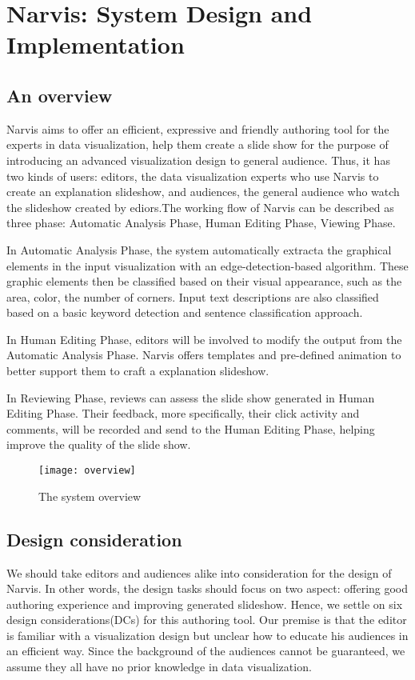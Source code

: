 
\section{Narvis: System Design and Implementation}
\subsection{An overview}

Narvis aims to offer an efficient, expressive and friendly authoring tool for the experts in data visualization, help them create a slide show for the purpose of introducing an advanced visualization design to general audience.  Thus, it has two kinds of users: editors, the data visualization experts who use Narvis to create an explanation slideshow, and audiences, the general audience who watch the slideshow created by ediors.The working flow of Narvis can be described as three phase: Automatic Analysis Phase, Human Editing Phase, Viewing Phase. 

In Automatic Analysis Phase, the system automatically extracta the graphical elements in the input visualization with an edge-detection-based algorithm. These graphic elements then be classified based on their visual appearance, such as the area, color, the number of corners. Input text descriptions are also classified based on a basic keyword detection and sentence classification approach. 

In Human Editing Phase, editors will be involved to modify the output from the Automatic Analysis Phase. Narvis offers templates and pre-defined animation to better support them to craft a explanation slideshow. 
 
In Reviewing Phase, reviews can assess the slide show generated in Human Editing Phase. Their feedback, more specifically, their click activity and comments, will be recorded and send to the Human Editing Phase, helping improve the quality of the slide show. 

\begin{figure}
 \centering %
 \texttt{[image: overview]}
 \caption{The system overview}
 \label{fig:overview}
\end{figure}

\subsection{Design consideration}
We should take editors and audiences alike into consideration for the design of Narvis. In other words, the design tasks should focus on two aspect: offering good authoring experience and improving generated slideshow. 
Hence, we settle on six design considerations(DCs) for this authoring tool. Our premise is that the editor is familiar with a visualization design but unclear how to educate his audiences in an efficient way. Since the background of the audiences cannot be guaranteed, we assume they all have no prior knowledge in data visualization. 

